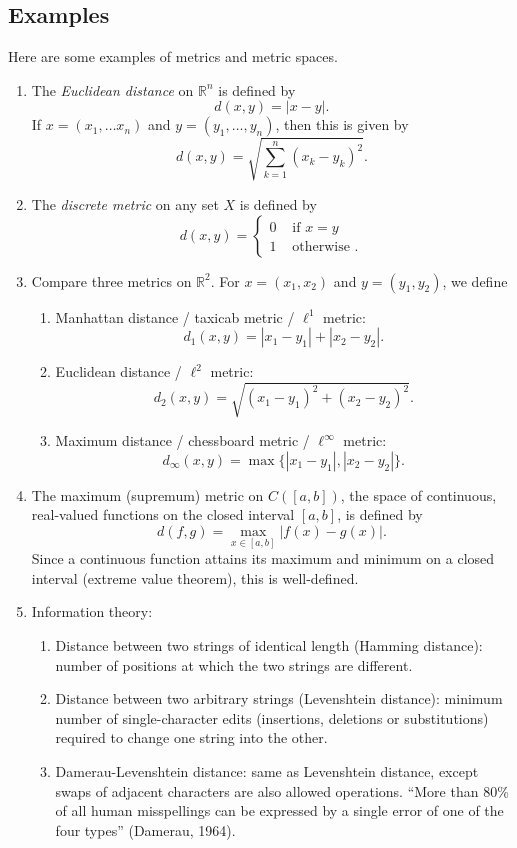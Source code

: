 \documentclass[12pt]{amsart}         %
\theoremstyle{remark}
\newcommand{\R}{\mathbb{R}}
\begin{document}
\subsection{Examples}

Here are some examples of metrics and metric spaces.

\begin{enumerate}
\item The \emph{Euclidean distance} on $\R^n$ is defined by
\[
d(x,y) = |x-y|.
\]
If $x = (x_1, \dots x_n)$ and $y = (y_1, \dots, y_n)$, then this is given by
\[
d(x,y) = \sqrt{ \sum_{k=1}^n (x_k - y_k)^2 }.
\]
\item The \emph{discrete metric} on any set $X$ is defined by
\[
d(x,y) = 
\begin{cases} 
    0 & \text{ if } x=y \\
    1 & \text{ otherwise }.
\end{cases}
\]
\item Compare three metrics on $\R^2$. For $x = (x_1, x_2)$ and $y = (y_1, y_2)$, we define
\begin{enumerate}
    \item Manhattan distance / taxicab metric / $\ell^1$ metric:
    \[
    d_1(x,y) = |x_1 - y_1| + |x_2 - y_2|.
    \]
    \item Euclidean distance / $\ell^2$ metric:
    \[
    d_2(x,y) = \sqrt{ (x_1 - y_1)^2 + (x_2 - y_2)^2 }.
    \]
    \item Maximum distance / chessboard metric / $\ell^\infty$ metric:
    \[
    d_\infty(x,y) = \max\{ |x_1 - y_1|,  |x_2 - y_2| \}.
    \]
\end{enumerate}

\item The maximum (supremum) metric on $C([a, b])$, the space of continuous, real-valued functions on the closed interval $[a, b]$, is defined by
\[
d(f, g) = \max_{x \in [a,b]}|f(x) - g(x)|.
\]
Since a continuous function attains its maximum and minimum on a closed interval (extreme value theorem), this is well-defined.

\item Information theory:
\begin{enumerate}
    \item Distance between two strings of identical length (Hamming distance): number of positions at which the two strings are different.
    \item Distance between two arbitrary strings (Levenshtein distance): minimum number of single-character edits (insertions, deletions or substitutions) required to change one string into the other.
    \item Damerau-Levenshtein distance: same as  Levenshtein distance, except swaps of adjacent characters are also allowed operations. ``More than 80\% of all human misspellings can be expressed by a single error of one of the four types'' (Damerau, 1964).
\end{enumerate}
    

\end{enumerate}
\end{document}
